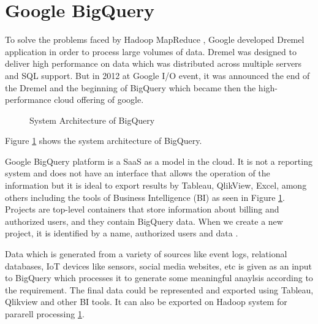 \documentclass[9pt,twocolumn,twoside]{../../styles/osajnl}
\begin{document}
\section{Google BigQuery}
To solve the problems faced by Hadoop \cite{www-apache-hadoop}
MapReduce \cite{mapreduce-article}, Google developed Dremel
application in order to process large volumes of data. Dremel was
designed to deliver high performance on data which was distributed
across multiple servers and SQL support. But in 2012 at Google I/O
event, it was announced the end of the Dremel and the beginning of
BigQuery which became then the high-performance cloud offering of
google.

\begin{figure}[htbp]
\centering
{}
\caption{\cite{www-bigquery-slideshare} System Architecture of BigQuery}
\label{fig:architecture}
\end{figure}

Figure \ref{fig:architecture} shows the system architecture of BigQuery.

\noindent
Google BigQuery \cite{bigquery-paper} platform is a SaaS as a model in
the cloud. It is not a reporting system and does not have an interface
that allows the operation of the information but it is ideal to export
results by Tableau, QlikView, Excel, among others including the tools
of Business Intelligence (BI) as seen in Figure
\ref{fig:architecture}. Projects are top-level containers that store
information about billing and authorized users, and they contain
BigQuery data. When we create a new project, it is identified by a
name, authorized users and data \cite{www-bigquery-documentation}.

Data which is generated from a variety of sources like event logs,
relational databases, IoT devices like sensors, social media websites,
etc is given as an input to BigQuery which processes it to generate
some meaningful anaylsis according to the requirement. The final data
could be represented and exported using Tableau, Qlikview and other BI
tools. It can also be exported on Hadoop system for pararell
processing \ref{fig:architecture}.
\end{document}
